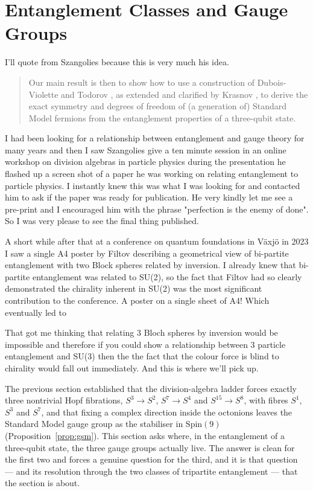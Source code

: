 \section{Entanglement Classes and Gauge Groups}
I'll quote from Szangolies \autocite{szangolies2025standardmodel} because this is very much his idea. 
\begin{quote}
Our main result is then to show how to use a construction of Dubois-Violette and Todorov \autocite{duboisviolette2016exceptional}, 
as extended and clarified by Krasnov \autocite{krasnov2021so9}, to derive the exact symmetry
and degrees of freedom of (a generation of) Standard Model fermions from the entanglement properties of a three-qubit state.
\end{quote}
I had been looking for a relationship between entanglement and gauge theory for many years and then I saw Szangolies 
give a ten minute session in an online workshop on division algebras in particle physics \autocite{szangolies_j_2021} 
during the presentation he flashed up a screen shot of a paper he was working on relating entanglement to particle physics.
I instantly knew this was what I was looking for and contacted him to ask if the paper was ready for publication. He very kindly let me
see a pre-print and I encouraged him with the phrase "perfection is the enemy of done". So I was very please to see the final thing published. 

A short while after that at a conference on quantum foundations in V\"axj\"o in 2023 I saw a single A4 poster by Filtov describing
a geometrical view of bi-partite entanglement with two Block spheres related by inversion. I already knew that bi-partite entanglement was 
related to SU(2), so the fact that Filtov had so clearly demonstrated the chirality inherent in SU(2) was the most significant 
contribution to the conference. A poster on a single sheet of A4! Which eventually led to \autocite{filatov2024towards}

That got me thinking that relating 3 Bloch spheres by inversion would be impossible and therefore if you could show a relationship between 3 particle entanglement and SU(3)
then the the fact that the colour force is blind to chirality would fall out immediately. And this is where we'll pick up. 

\label{sec:entanglement-classes}

The previous section established that the division-algebra ladder forces exactly three nontrivial
Hopf fibrations, $S^3 \to S^2$, $S^7 \to S^4$ and $S^{15} \to S^8$, with fibres $S^1$, $S^3$ and
$S^7$, and that fixing a complex direction inside the octonions leaves the Standard Model gauge
group as the stabiliser in $\mathrm{Spin}(9)$ (Proposition~\ref{prop:gsm}). This section asks where,
in the entanglement of a three-qubit state, the three gauge groups actually live. The answer is
clean for the first two and forces a genuine question for the third, and it is that question --- and
its resolution through the two classes of tripartite entanglement --- that the section is about.

